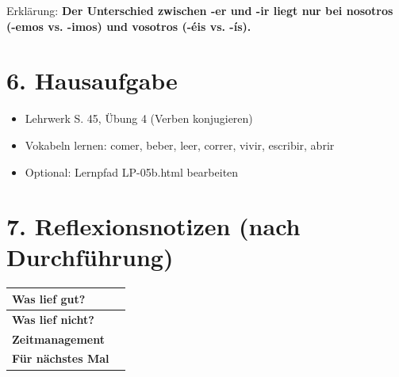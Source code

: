 \documentclass[11pt, a4paper]{article}
\newcommand{\lsg}[1]{\textcolor{loesung}{\textbf{#1}}}
\begin{document}
Erklärung: \lsg{Der Unterschied zwischen -er und -ir liegt nur bei nosotros (-emos vs. -imos) und vosotros (-éis vs. -ís).}


\section*{6. Hausaufgabe}

\begin{itemize}
    \item Lehrwerk S. 45, Übung 4 (Verben konjugieren)
    \item Vokabeln lernen: comer, beber, leer, correr, vivir, escribir, abrir
    \item Optional: Lernpfad LP-05b.html bearbeiten
\end{itemize}


\section*{7. Reflexionsnotizen (nach Durchführung)}

\begin{tabularx}{\textwidth}{|l|X|}
\hline
\textbf{Was lief gut?} & \\[2em]
\hline
\textbf{Was lief nicht?} & \\[2em]
\hline
\textbf{Zeitmanagement} & \\[2em]
\hline
\textbf{Für nächstes Mal} & \\[2em]
\hline
\end{tabularx}
\end{document}

